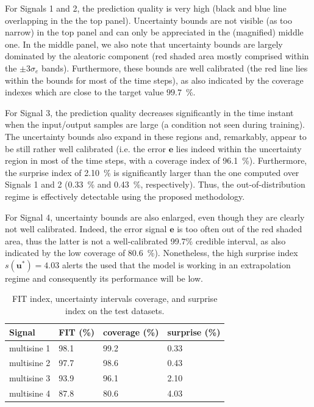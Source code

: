 \documentclass{article}
\newcommand{\tvec}[1]{{\mathbf{#1}}}
\begin{document}
For Signals 1 and 2, the prediction quality is very high (black and blue line overlapping in the the top panel). Uncertainty bounds are not visible (as too narrow) in the top panel and can only be appreciated in the (magnified) middle one. In the middle panel, we also note that uncertainty bounds are largely dominated by the aleatoric component (red shaded area mostly comprised within the $\pm 3 \sigma_e$ bands). Furthermore, these bounds are well calibrated (the red line lies within the bounds for most of the time steps), as also indicated by the coverage indexes which are close to the target value $99.7$~\%.


For Signal 3, the prediction quality decreases significantly in the time instant when the input/output samples are large (a condition not seen during training). The uncertainty bounds also expand in these regions and, remarkably, appear to be still rather well calibrated (i.e. the error $\tvec{e}$ lies indeed within the uncertainty region in most of the time steps, with a coverage index of 96.1~\%). Furthermore, the surprise index of 2.10~\% is significantly larger than the one computed over Signals 1 and 2 (0.33~\% and 0.43~\%, respectively).
Thus, the out-of-distribution regime is effectively detectable using the proposed methodology.

For Signal 4, uncertainty bounds are also enlarged, even though they are clearly not well calibrated. Indeed, the error signal $\tvec{e}$ is 
too often out of the red shaded area, thus the latter is not a well-calibrated 99.7\% credible interval, as also indicated by the low coverage of 80.6~\%). Nonetheless, the high surprise index $s(\tvec{u}^*)=4.03$  alerts the used that the model is working in an extrapolation regime and consequently its performance will be low.

\begin{table}%
    \centering
    \begin{tabular}{|l||l|l|l|}
    \hline
    Signal &  FIT (\%) & coverage (\%) & surprise (\%)\\
    \hline
    multisine 1 &98.1 & 99.2 & 0.33\\
    multisine 2 &97.7 & 98.6 & 0.43\\
    multisine 3 &93.9 & 96.1 & 2.10\\
    multisine 4 &87.8 & 80.6 & 4.03  \\
    \hline
    \end{tabular}
    \caption{FIT index, uncertainty intervals coverage, and surprise index on the test datasets.}
    \label{tab:wh_results}
\end{table}
\end{document}
